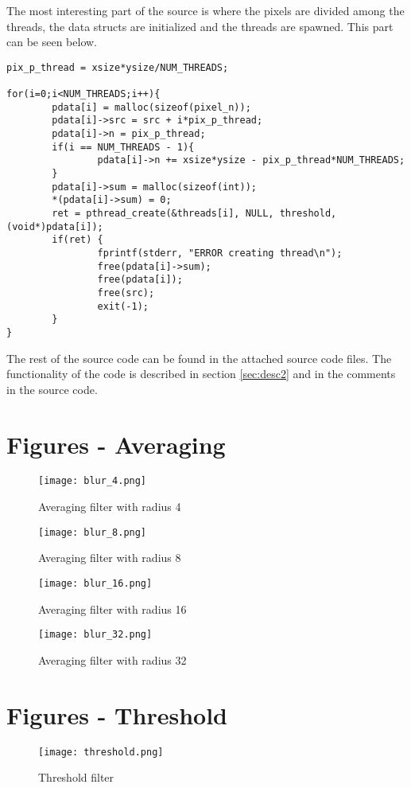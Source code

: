 \documentclass[a4paper, 12pt]{article}
\begin{document}
The most interesting part of the source is where the pixels are divided among
the threads, the data structs are initialized and the threads are spawned. 
This part can be seen below.
\begin{lstlisting}
pix_p_thread = xsize*ysize/NUM_THREADS;

for(i=0;i<NUM_THREADS;i++){
        pdata[i] = malloc(sizeof(pixel_n));
        pdata[i]->src = src + i*pix_p_thread;
        pdata[i]->n = pix_p_thread;
        if(i == NUM_THREADS - 1){
                pdata[i]->n += xsize*ysize - pix_p_thread*NUM_THREADS;
        }
        pdata[i]->sum = malloc(sizeof(int));
        *(pdata[i]->sum) = 0;
        ret = pthread_create(&threads[i], NULL, threshold, (void*)pdata[i]);
        if(ret) {
                fprintf(stderr, "ERROR creating thread\n");
                free(pdata[i]->sum);
                free(pdata[i]);
                free(src);
                exit(-1);
        }
}
\end{lstlisting}

The rest of the source code can be found in the attached source code files.
The functionality of the code is described in section \ref{sec:desc2} and in the
comments in the source code.

\newpage
\appendix
\section{Figures - Averaging}
\label{sec:fig_aver}

\begin{figure}[hb]
        \centering
        \texttt{[image: blur\_4.png]}
        \caption{Averaging filter with radius 4}
        \label{fig:blur_4}
\end{figure}
\begin{figure}[hb]
        \centering
        \texttt{[image: blur\_8.png]}
        \caption{Averaging filter with radius 8}
        \label{fig:blur_8}
\end{figure}
\begin{figure}[hb]
        \centering
        \texttt{[image: blur\_16.png]}
        \caption{Averaging filter with radius 16}
        \label{fig:blur_16}
\end{figure}
\begin{figure}[hb]
        \centering
        \texttt{[image: blur\_32.png]}
        \caption{Averaging filter with radius 32}
        \label{fig:blur_32}
\end{figure}
\clearpage

\section{Figures - Threshold}
\label{sec:fig_thres}

\begin{figure}[h]
        \centering
        \texttt{[image: threshold.png]}
        \caption{Threshold filter}
        \label{fig:thres}
\end{figure}
\end{document}
